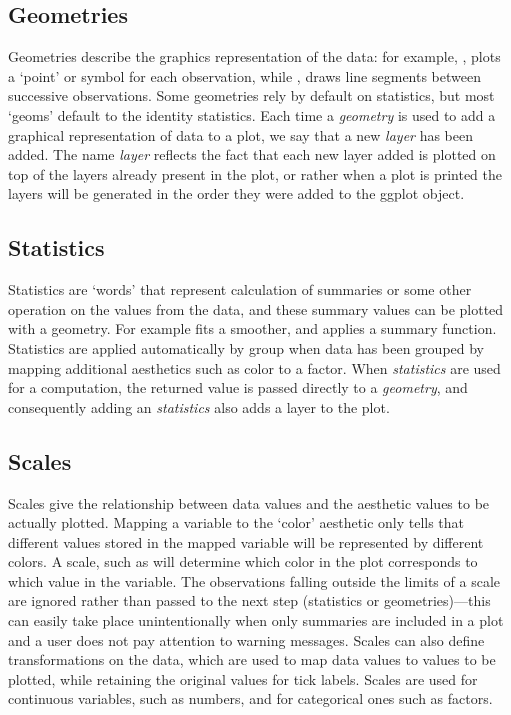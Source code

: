 \documentclass[krantz2]{krantz}\usepackage{knitr}%
\begin{document}
\subsection{Geometries}

\sloppy%
Geometries describe the graphics representation of the data: for example, , plots a `point' or symbol for each observation, while , draws line segments between successive observations. Some geometries rely by default on statistics, but most `geoms' default to the identity statistics. Each time a \emph{geometry} is used to add a graphical representation of data to a plot, we say that a new \emph{layer} has been added. The name \emph{layer} reflects the fact that each new layer added is plotted on top of the layers already present in the plot, or rather when a plot is printed the layers will be generated in the order they were added to the ggplot object.

\subsection{Statistics}

Statistics are `words' that represent calculation of summaries or some other operation on the values from the data, and these summary values can be plotted with a geometry. For example  fits a smoother, and  applies a summary function. Statistics are applied automatically by group when data has been grouped by mapping additional aesthetics such as color to a factor. When \emph{statistics} are used for a computation, the returned value is passed directly to a \emph{geometry}, and consequently adding an \emph{statistics} also adds a layer to the plot.

\subsection{Scales}

Scales give the relationship between data values and the aesthetic values to be actually plotted. Mapping a variable to the `color' aesthetic only tells that different values stored in the mapped variable will be represented by different colors. A scale, such as  will determine which color in the plot corresponds to which value in the variable. The observations falling outside the limits of a scale are ignored rather than passed to the next step (statistics or geometries)---this can easily take place unintentionally when only summaries are included in a plot and a user does not pay attention to warning messages. Scales can also define transformations on the data, which are used to map data values to values to be plotted, while retaining the original values for tick labels.  Scales are used for continuous variables, such as numbers, and for categorical ones such as factors.
\end{document}
